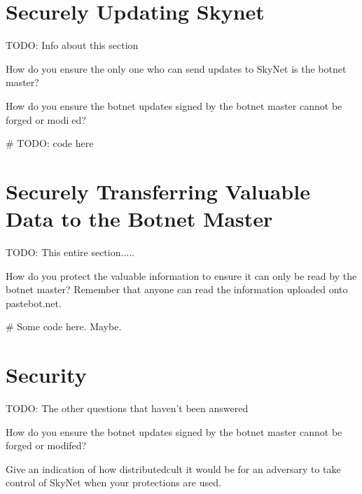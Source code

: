 \documentclass[9pt,a4paper]{article}
\begin{document}
\maketitle
\small
\setlength{\parindent}{0pt}

\section{Securely Updating Skynet}
\vspace{-2ex}
TODO: Info about this section

How do you ensure the only one who can send updates to SkyNet is the botnet master?

How do you ensure the botnet updates signed by the botnet master cannot be forged or modied?

\begin{center}
\vspace{-2ex}
\begin{python}
# TODO: code here
\end{python}
\end{center}

\section{Securely Transferring Valuable Data to the Botnet Master}
\vspace{-2ex}
TODO: This entire section.....

How do you protect the valuable information to ensure it can only be read by the botnet master? Remember that anyone can read the information uploaded onto pastebot.net.


\begin{center}
\vspace{-2ex}
\begin{python}
# Some code here. Maybe.
\end{python}
\end{center}

\section{Security}
\vspace{-2ex}
TODO: The other questions that haven't been answered


How do you ensure the botnet updates signed by the botnet master cannot be forged or modifed?

Give an indication of how distributedcult it would be for an adversary to take control of SkyNet when your protections are used.
\end{document}
